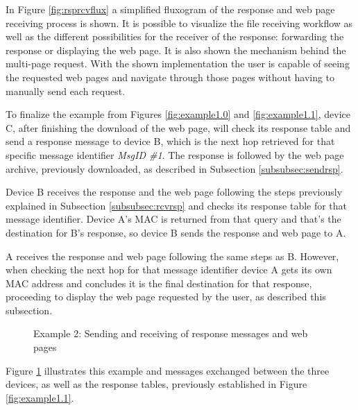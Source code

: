 In Figure \ref{fig:rsprcvflux} a simplified fluxogram of the response and web page receiving process is shown. It is possible to visualize the file receiving workflow as well as the different possibilities for the receiver of the response: forwarding the response or displaying the web page. It is also shown the mechanism behind the multi-page request. With the shown implementation the user is capable of seeing the requested web pages and navigate through those pages without having to manually send each request.

To finalize the example from Figures \ref{fig:example1.0} and \ref{fig:example1.1}, device C, after finishing the download of the web page, will check its response table and send a response message to device B, which is the next hop retrieved for that specific message identifier \textit{MsgID \#1}. The response is followed by the web page archive, previously downloaded, as described in Subsection \ref{subsubsec:sendrsp}.

Device B receives the response and the web page following the steps previously explained in Subsection \ref{subsubsec:rcvrsp} and checks its response table for that message identifier. Device A's \gls{MAC} is returned from that query and that's the destination for B's response, so device B sends the response and web page to A.

A receives the response and web page following the same steps as B. However, when checking the next hop for that message identifier device A gets its own \gls{MAC} address and concludes it is the final destination for that response, proceeding to display the web page requested by the user, as described this subsection.

\begin{figure}[ht]
   \noindent{}
	\caption{\label{fig:example1.2} Example 2: Sending and receiving of response messages and web pages}
\end{figure}

Figure \ref{fig:example1.2} illustrates this example and messages exchanged between the three devices, as well as the response tables, previously established in Figure \ref{fig:example1.1}.











